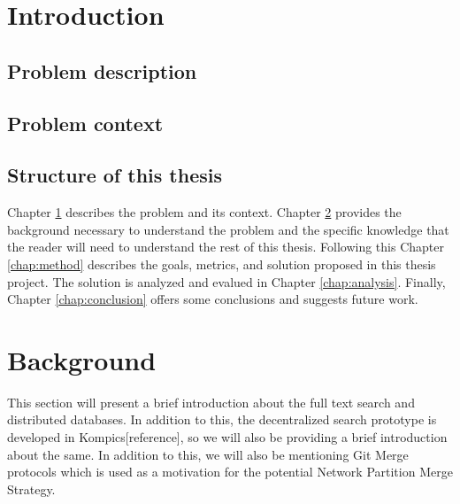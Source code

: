 \documentclass[12pt,a4paper,twoside,openright]{book}
\begin{document}
\mainmatter
\setcounter{secnumdepth}{5} 
\chapter{Introduction}
\label{chap:introduction}



\section{Problem description}
\label{sec:problem_description}




\section{Problem context}
\label{sec:problem_context}



\section{Structure of this thesis}
\label{sec:thesis_structure}

Chapter \ref{chap:introduction} describes the problem and its context.
Chapter \ref{chap:background} provides the background necessary to understand the
problem and the specific knowledge that the reader will need to understand the
rest of this thesis. Following this Chapter \ref{chap:method} describes the
goals, metrics, and solution proposed in this thesis project. The solution is
analyzed and evalued in Chapter \ref{chap:analysis}. Finally, Chapter
\ref{chap:conclusion} offers some conclusions and suggests future work.


\chapter{Background}
\label{chap:background}

This section will present a brief introduction about the full text search and distributed databases. In addition to this, the decentralized search prototype is developed in Kompics[reference], so we will also be providing a brief introduction about the same. In addition to this, we will also be mentioning Git Merge protocols which is used as a motivation for the potential Network Partition Merge Strategy.
\end{document}
